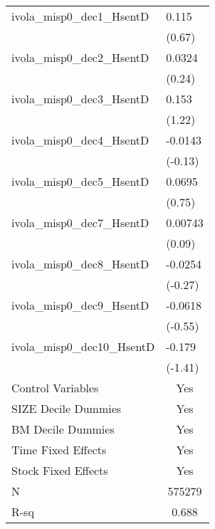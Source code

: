 \begin{tabular}{lc}
ivola_misp0_dec1_HsentD & \multicolumn{1}{l}{0.115} \\
        & \multicolumn{1}{l}{(0.67)} \\
ivola_misp0_dec2_HsentD & \multicolumn{1}{l}{0.0324} \\
        & \multicolumn{1}{l}{(0.24)} \\
ivola_misp0_dec3_HsentD & \multicolumn{1}{l}{0.153} \\
        & \multicolumn{1}{l}{(1.22)} \\
ivola_misp0_dec4_HsentD & \multicolumn{1}{l}{-0.0143} \\
        & \multicolumn{1}{l}{(-0.13)} \\
ivola_misp0_dec5_HsentD & \multicolumn{1}{l}{0.0695} \\
        & \multicolumn{1}{l}{(0.75)} \\
ivola_misp0_dec7_HsentD & \multicolumn{1}{l}{0.00743} \\
        & \multicolumn{1}{l}{(0.09)} \\
ivola_misp0_dec8_HsentD & \multicolumn{1}{l}{-0.0254} \\
        & \multicolumn{1}{l}{(-0.27)} \\
ivola_misp0_dec9_HsentD & \multicolumn{1}{l}{-0.0618} \\
        & \multicolumn{1}{l}{(-0.55)} \\
ivola_misp0_dec10_HsentD & \multicolumn{1}{l}{-0.179} \\
        & \multicolumn{1}{l}{(-1.41)} \\
\midrule
Control Variables & Yes \\
SIZE Decile Dummies & Yes \\
BM Decile Dummies & Yes \\
Time Fixed Effects & Yes \\
Stock Fixed Effects & Yes \\
N       & 575279 \\
R-sq    & 0.688 \\
\bottomrule
\end{tabular}%
